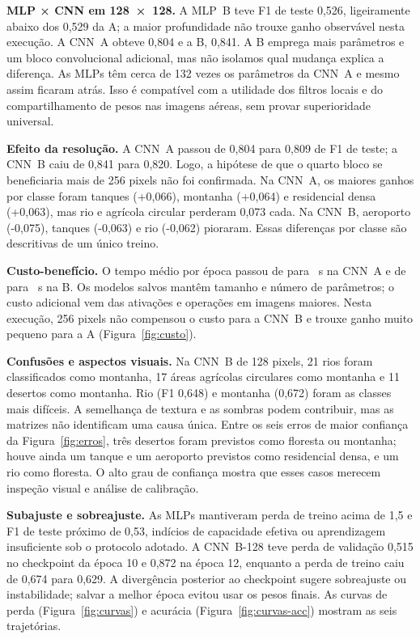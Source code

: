 \documentclass[12pt,a4paper]{article}
\begin{document}
\textbf{MLP × CNN em 128~×~128.} A MLP~B teve F1 de teste 0,526, ligeiramente abaixo dos 0,529 da A; a maior profundidade não trouxe ganho observável nesta execução. A CNN~A obteve 0,804 e a B, 0,841. A B emprega mais parâmetros e um bloco convolucional adicional, mas não isolamos qual mudança explica a diferença. As MLPs têm cerca de 132 vezes os parâmetros da CNN~A e mesmo assim ficaram atrás. Isso é compatível com a utilidade dos filtros locais e do compartilhamento de pesos nas imagens aéreas, sem provar superioridade universal.

\textbf{Efeito da resolução.} A CNN~A passou de 0,804 para 0,809 de F1 de teste; a CNN~B caiu de 0,841 para 0,820. Logo, a hipótese de que o quarto bloco se beneficiaria mais de 256 pixels não foi confirmada. Na CNN~A, os maiores ganhos por classe foram tanques (+0,066), montanha (+0,064) e residencial densa (+0,063), mas rio e agrícola circular perderam 0,073 cada. Na CNN~B, aeroporto (-0,075), tanques (-0,063) e rio (-0,062) pioraram. Essas diferenças por classe são descritivas de um único treino.

\textbf{Custo-benefício.} O tempo médio por época passou de  para ~s na CNN~A e de  para ~s na B. Os modelos salvos mantêm tamanho e número de parâmetros; o custo adicional vem das ativações e operações em imagens maiores. Nesta execução, 256 pixels não compensou o custo para a CNN~B e trouxe ganho muito pequeno para a A (Figura~\ref{fig:custo}).

\textbf{Confusões e aspectos visuais.} Na CNN~B de 128 pixels, 21 rios foram classificados como montanha, 17 áreas agrícolas circulares como montanha e 11 desertos como montanha. Rio (F1 0,648) e montanha (0,672) foram as classes mais difíceis. A semelhança de textura e as sombras podem contribuir, mas as matrizes não identificam uma causa única. Entre os seis erros de maior confiança da Figura~\ref{fig:erros}, três desertos foram previstos como floresta ou montanha; houve ainda um tanque e um aeroporto previstos como residencial densa, e um rio como floresta. O alto grau de confiança mostra que esses casos merecem inspeção visual e análise de calibração.

\textbf{Subajuste e sobreajuste.} As MLPs mantiveram perda de treino acima de 1,5 e F1 de teste próximo de 0,53, indícios de capacidade efetiva ou aprendizagem insuficiente sob o protocolo adotado. A CNN~B-128 teve perda de validação 0,515 no checkpoint da época 10 e 0,872 na época 12, enquanto a perda de treino caiu de 0,674 para 0,629. A divergência posterior ao checkpoint sugere sobreajuste ou instabilidade; salvar a melhor época evitou usar os pesos finais. As curvas de perda (Figura~\ref{fig:curvas}) e acurácia (Figura~\ref{fig:curvas-acc}) mostram as seis trajetórias.
\end{document}
